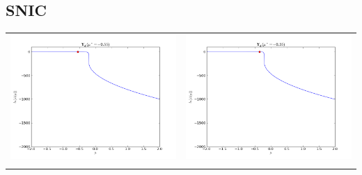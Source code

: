 \subsection{SNIC}
\begin{table}[ht]
\centering
\begin{tabular}{cc}
\includegraphics[scale=0.3]{likelihood_sinc_055m}&\includegraphics[scale=0.3]{likelihood_snic035m}\\
\newline

\end{tabular}
\end{table}
